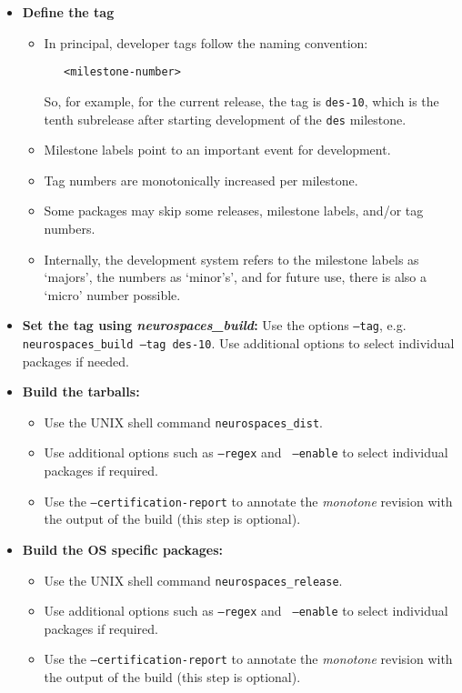 \documentclass[12pt]{article}
\begin{document}
\begin{itemize}
\item {\bf Define the tag}
  \begin{itemize}
  \item In principal, developer tags follow the naming convention:
\begin{verbatim}
   <milestone-number>
\end{verbatim}   
    So, for example, for the current release, the tag is {\tt des-10}, which is the tenth subrelease after starting development of the {\tt des} milestone.
  \item Milestone labels point to an important event for development.
  \item Tag numbers are monotonically increased per milestone.
  \item Some packages may skip some releases, milestone labels, and/or tag numbers.
  \item Internally, the development system refers to the milestone labels as `majors', the numbers as `minor's', and for future use, there is also a `micro' number possible.
  \end{itemize}
  
\item {\bf Set the tag using {\it neurospaces\_build}:} Use the options {\tt --tag}, e.g. {\tt neurospaces\_build --tag des-10}. Use additional options to select individual packages if needed.
\item {\bf Build the tarballs:}
  \begin{itemize}
  \item Use the UNIX shell command {\tt neurospaces\_dist}.
  \item Use additional options such as {\tt --regex} and {\tt
      --enable} to select individual packages if required.
  \item Use the {\tt --certification-report} to annotate the {\it
      monotone} revision with the output of the build (this step is
    optional).
  \end{itemize}

\item {\bf Build the OS specific packages:}
  \begin{itemize}
  \item Use the UNIX shell command {\tt neurospaces\_release}.
  \item Use additional options such as {\tt --regex} and {\tt
      --enable} to select individual packages if required.
  \item Use the {\tt --certification-report} to annotate the {\it
      monotone} revision with the output of the build (this step is
    optional).
  \end{itemize}


\end{itemize}
\end{document}
